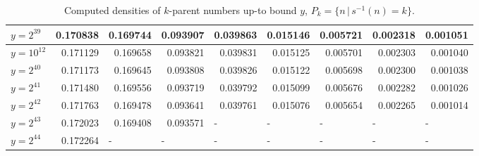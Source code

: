 \documentclass{article}
\theoremstyle{definition}
\begin{document}
\begin{table}[h!]
{\begin{tabular}{l|rrrrrrrr}
            $y = 2^{39}$             & 0.170838 & 0.169744              & 0.093907              & 0.039863              & 0.015146              & 0.005721              & 0.002318              & 0.001051              \\
            \hline
            $y = 10^{12}$            & 0.171129 & 0.169658              & 0.093821              & 0.039831              & 0.015125              & 0.005701              & 0.002303              & 0.001040              \\
            \hline
            $y = 2^{40}$             & 0.171173 & 0.169645              & 0.093808              & 0.039826              & 0.015122              & 0.005698              & 0.002300              & 0.001038              \\
            $y = 2^{41}$             & 0.171480 & 0.169556              & 0.093719              & 0.039792              & 0.015099              & 0.005676              & 0.002282              & 0.001026              \\
            $y = 2^{42}$             & 0.171763 & 0.169478              & 0.093641              & 0.039761              & 0.015076              & 0.005654              & 0.002265              & 0.001014              \\
            $y = 2^{43}$             & 0.172023 & 0.169408              & 0.093571              & \multicolumn{1}{l}{-} & \multicolumn{1}{l}{-} & \multicolumn{1}{l}{-} & \multicolumn{1}{l}{-} & \multicolumn{1}{l}{-} \\
            $y = 2^{44}$             & 0.172264 & \multicolumn{1}{l}{-} & \multicolumn{1}{l}{-} & \multicolumn{1}{l}{-} & \multicolumn{1}{l}{-} & \multicolumn{1}{l}{-} & \multicolumn{1}{l}{-} & \multicolumn{1}{l}{-}
        \end{tabular} 
    }
    \label{tab:pomyang_all}
    \caption{Computed densities of $k$-parent numbers up-to bound $y$, $P_k = \{n \,|\, s^{-1}(n) = k\}$.}
\end{table}

\pagebreak
\end{document}
